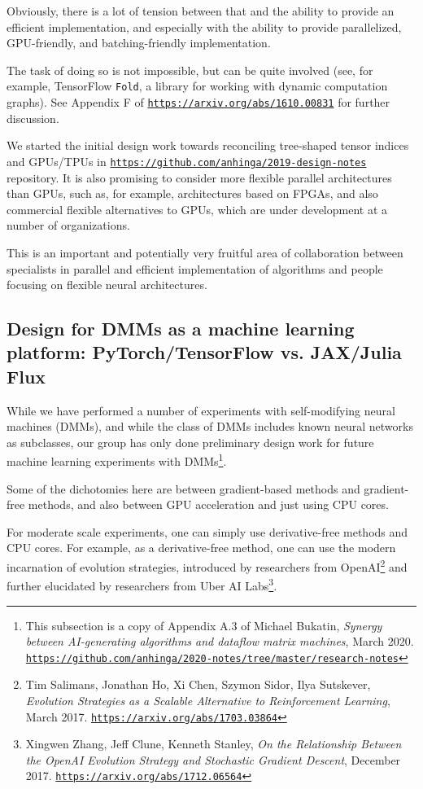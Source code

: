 \documentclass{article}
\begin{document}
Obviously, there is a lot of tension between that and the ability to provide an efficient implementation,
and especially with the ability to provide parallelized, GPU-friendly, and batching-friendly implementation.

The task of doing so is not impossible, but can be quite involved (see, for example, TensorFlow {\tt Fold},
a library for working with dynamic computation graphs). See Appendix F of \href{https://arxiv.org/abs/1610.00831}{\tt https://arxiv.org/abs/1610.00831} for further discussion.

We started the initial design work towards reconciling tree-shaped tensor indices and GPUs/TPUs in
\href{https://github.com/anhinga/2019-design-notes}{\tt https://github.com/anhinga/2019-design-notes}
repository. It is also promising to consider more flexible parallel architectures than GPUs, such
as, for example, architectures based on FPGAs, and also commercial flexible alternatives to GPUs,
which are under development at a number of organizations. 

This is an important and potentially very fruitful area of collaboration between specialists in parallel and efficient implementation
of algorithms and people focusing on flexible neural architectures.

\subsection{Design for DMMs as a machine learning platform: PyTorch/TensorFlow vs. JAX/Julia Flux}

While we have performed a number of experiments with self-modifying neural machines (DMMs),
and while the class of DMMs includes known neural networks as subclasses,
our group has only done preliminary design work for future machine learning experiments with DMMs\footnote{This subsection
is a copy of Appendix A.3 of Michael Bukatin, {\em Synergy between AI-generating algorithms and dataflow matrix machines},
March 2020.
\href{https://github.com/anhinga/2020-notes/tree/master/research-notes}
{\tt https://github.com/anhinga/2020-notes/tree/master/research-notes}}.

Some of the dichotomies here are between gradient-based methods and gradient-free methods,
and also between GPU acceleration and just using CPU cores.

For moderate scale experiments, one can simply use derivative-free methods and CPU cores.
For example, as a derivative-free method, one can use the modern incarnation of evolution strategies, introduced by researchers from OpenAI\footnote{Tim Salimans, Jonathan Ho, Xi Chen, Szymon Sidor, Ilya Sutskever, {\em Evolution Strategies as a Scalable Alternative to Reinforcement Learning}, March 2017.
\href{https://arxiv.org/abs/1703.03864}{\tt https://arxiv.org/abs/1703.03864}}  and
further elucidated by researchers from Uber AI Labs\footnote{Xingwen Zhang, Jeff Clune, Kenneth Stanley,
{\em On the Relationship Between the OpenAI Evolution Strategy and Stochastic Gradient Descent}, December 2017.
\href{https://arxiv.org/abs/1712.06564}{\tt https://arxiv.org/abs/1712.06564}}. 
\end{document}
